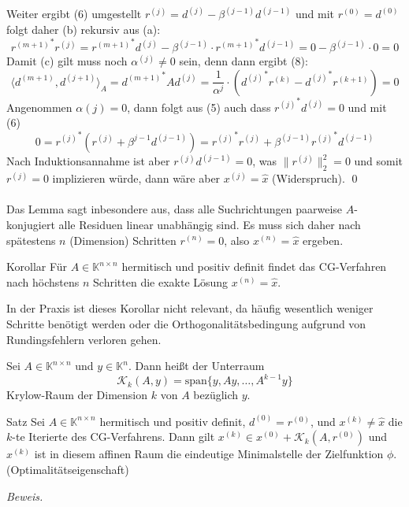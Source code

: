 Weiter ergibt (6) umgestellt $r^{(j)} = d^{(j)} - \beta^{(j-1)}d^{(j-1)}$ und mit $r^{(0)}=d^{(0)}$ folgt 
daher (b) rekursiv aus (a):
\[{r^{(m+1)}}^*r^{(j)} = {r^{(m+1)}}^*d^{(j)} - \beta^{(j-1)}\cdot {r^{(m+1)}}^*d^{(j-1)} = 
0 - \beta^{(j-1)}\cdot 0 = 0\]
Damit (c) gilt muss noch $\alpha^{(j)}\neq 0$ sein, denn dann ergibt (8):
\[\langle d^{(m+1)}, d^{(j+1)}\rangle_A = {d^{(m+1)}}^*Ad^{(j)} = 
\dfrac{1}{\alpha^{j}}\cdot\left({d^{(j)}}^*r^{(k)}-{d^{(j)}}^*r^{(k+1)}\right) = 0 \]
Angenommen $\alpha{(j)} = 0$, dann folgt aus (5) auch dass ${r^{(j)}}^*d^{(j)}=0$ und mit (6) 
\[0 = {r^{(j)}}^*\left(r^{(j)}+\beta^{j-1}d^{(j-1)}\right) = {r^{(j)}}^*r^{(j)}+\beta^{(j-1)}{r^{(j)}}^*d^{(j-1)}\]
Nach Induktionsannahme ist aber ${r^{(j)}}d^{(j-1)} = 0$, was $\|r^{(j)}\|_2^2 = 0$ und 
somit $r^{(j)} = 0$ implizieren würde, dann wäre aber $x^{(j)}=\hat{x}$ (Widerspruch). \qed \\ \\
Das Lemma sagt inbesondere aus, dass alle Suchrichtungen paarweise $A$-konjugiert alle Residuen linear unabhängig sind.
Es muss sich daher nach spätestens $n$ (Dimension) Schritten $r^{(n)}=0$, also $x^{(n)}=\hat{x}$ ergeben.
\begin{thmbox}{Korollar}
    Für $A\in\mathbb{K}^{n\times n}$ hermitisch und positiv definit findet das CG-Verfahren nach 
    höchstens $n$ Schritten die exakte Lösung $x^{(n)}=\hat{x}$.
\end{thmbox}
In der Praxis ist dieses Korollar nicht relevant, da häufig wesentlich weniger Schritte benötigt werden oder die 
Orthogonalitätsbedingung aufgrund von Rundingsfehlern verloren gehen.
\begin{defbox}
    Sei $A\in\mathbb{K}^{n\times n}$ und $y\in\mathbb{K}^n$. Dann heißt der Unterraum 
    \[\mathcal{K}_k(A,y)=\text{span}\{y,Ay,\dotsc,A^{k-1}y\}\] 
    Krylow-Raum der Dimension $k$ von $A$ bezüglich $y$.
\end{defbox}
\begin{thmbox}{Satz}
    Sei $A\in\mathbb{K}^{n\times n}$ hermitisch und positiv definit, $d^{(0)}=r^{(0)}$, und $x^{(k)}\neq \hat{x}$ 
    die $k$-te Iterierte des CG-Verfahrens. Dann gilt $x^{(k)}\in x^{(0)} + \mathcal{K}_k(A,r^{(0)})$ und $x^{(k)}$ ist 
    in diesem affinen Raum die eindeutige Minimalstelle der Zielfunktion $\phi$. (Optimalitätseigenschaft)
\end{thmbox}
\textit{Beweis.} 
